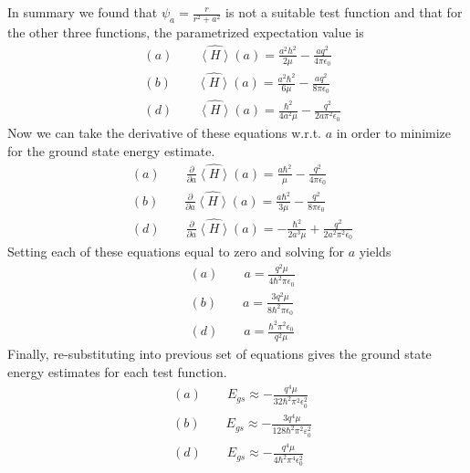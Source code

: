 \documentclass[a4paper, 11pt]{article}
\newcommand{\expectation}[1]{\ensuremath{\left\langle #1 \right\rangle}}
\newenvironment{solution}{%
	\begin{list}{}{%
			\setlength{\topsep}{0pt}%
			\setlength{\leftmargin}{0.5cm}%
			\setlength{\rightmargin}{0.5cm}%
			\setlength{\listparindent}{\parindent}%
			\setlength{\itemindent}{\parindent}%
			\setlength{\parsep}{\parskip}%
		}%
		\item[]}{\end{list}}
\begin{document}
\begin{enumerate}[leftmargin=0em, label=\textbf{\arabic*}]
\begin{solution}
      In summary we found that $\psi_a=\frac{r}{r^2+a^2}$ is not a suitable test
      function and that for the other three functions, the parametrized
      expectation value is
      \begin{align}
        &(a)\qquad \hat{\expectation{H}}(a) = \frac{a^2h^2}{2\mu}-\frac{aq^2}{4\pi\epsilon_0}\\
        &(b)\qquad \hat{\expectation{H}}(a) = \frac{a^2\hbar^2}{6\mu}-\frac{aq^2}{8\pi\epsilon_0}\\
        &(d)\qquad \hat{\expectation{H}}(a) = \frac{\hbar^2}{4a^2\mu}-\frac{q^2}{2a\pi^2\epsilon_0}
      \end{align}
      Now we can take the derivative of these equations w.r.t. $a$ in order to
      minimize for the ground state energy estimate.
      \begin{align}
        &(a)\qquad \frac{\partial}{\partial a}\hat{\expectation{H}}(a) =  \frac{a\hbar^2}{\mu} - \frac{q^2}{4\pi\epsilon_0}\\ 
        &(b)\qquad \frac{\partial}{\partial a}\hat{\expectation{H}}(a) = \frac{a\hbar^2}{3\mu}-\frac{q^2}{8\pi\epsilon_0}\\
        &(d)\qquad \frac{\partial}{\partial a}\hat{\expectation{H}}(a) = -\frac{\hbar^2}{2a^3\mu}+\frac{q^2}{2a^2\pi^2\epsilon_0}
      \end{align}
      Setting each of these equations equal to zero and solving for $a$ yields
      \begin{align}
        &(a)\qquad a = \frac{q^2\mu}{4\hbar^2\pi\epsilon_0}\\
        &(b)\qquad a = \frac{3q^2\mu}{8\hbar^2\pi\epsilon_0}\\
        &(d)\qquad a = \frac{\hbar^2\pi^2\epsilon_0}{q^2\mu}
      \end{align}
      Finally, re-substituting into previous set of equations gives the ground
      state energy estimates for each test function.
       \begin{align}
        &(a)\qquad E_{gs} \approx -\frac{q^4\mu}{32\hbar^2\pi^2\epsilon_0^2}\\
        &(b)\qquad E_{gs} \approx -\frac{3q^4\mu}{128\hbar^2\pi^2\varepsilon_0^2}\\
        &(d)\qquad E_{gs} \approx -\frac{q^4\mu}{4\hbar^2\pi^4\epsilon_0^2}
      \end{align}
 
    \end{solution}








\end{enumerate}
\end{document}
